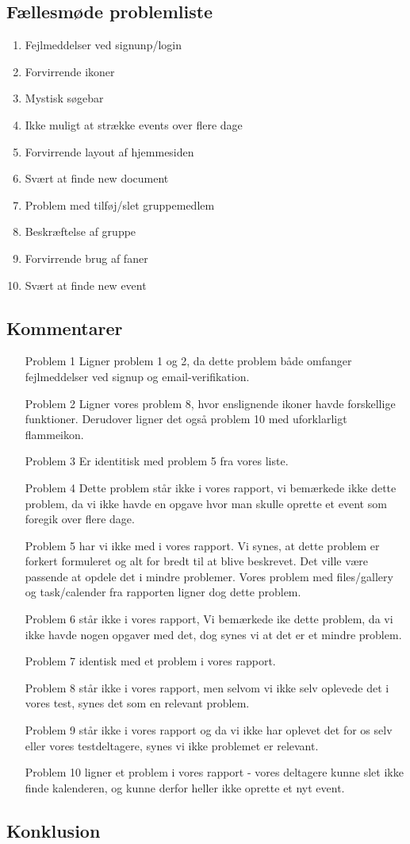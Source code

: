 \documentclass[12pt]{article}
\begin{document}
\subsection*{Fællesmøde problemliste}
\begin{enumerate}
  \item  Fejlmeddelser ved signunp/login
  \item  Forvirrende ikoner
  \item  Mystisk søgebar 
  \item  Ikke muligt at strække events over flere dage
  \item  Forvirrende layout af hjemmesiden
  \item  Svært at finde new document
  \item  Problem med tilføj/slet gruppemedlem 
  \item  Beskræftelse af gruppe 
  \item  Forvirrende brug af faner
  \item  Svært at finde new event
\end{enumerate}
\subsection*{Kommentarer}
\begin{enumerate}
  \item [Problem 1] Ligner problem 1 og 2, da dette problem både omfanger fejlmeddelser ved signup og email-verifikation.
  \item [Problem 2] Ligner vores problem 8, hvor enslignende ikoner havde forskellige funktioner. Derudover ligner det også problem 10 med uforklarligt flammeikon. 
  \item [Problem 3] Er identitisk med problem 5 fra vores liste.
  \item [Problem 4] Dette problem står ikke i vores rapport, vi bemærkede ikke dette problem, da vi ikke havde en opgave hvor man skulle oprette et event som foregik over flere dage.
  \item [Problem 5] har vi ikke med i vores rapport. Vi synes, at dette problem er forkert formuleret og alt for bredt til at blive beskrevet. Det ville være passende at opdele det i mindre problemer. Vores problem med files/gallery og task/calender fra rapporten ligner dog dette problem.
  \item [Problem 6] står ikke i vores rapport, Vi bemærkede ike dette problem, da vi ikke havde nogen opgaver med det, dog synes vi at det er et mindre problem.
  \item [Problem 7] identisk med et problem i vores rapport.
  \item [Problem 8] står ikke i vores rapport, men selvom vi ikke selv oplevede det i vores test, synes det som en relevant problem.
  \item [Problem 9] står ikke i vores rapport og da vi ikke har oplevet det for os selv eller vores testdeltagere, synes vi ikke problemet er relevant.
  \item [Problem 10] ligner et problem i vores rapport - vores deltagere kunne slet ikke finde kalenderen, og kunne derfor heller ikke oprette et nyt event.
   
\end{enumerate}
\subsection*{Konklusion}
\end{document}
